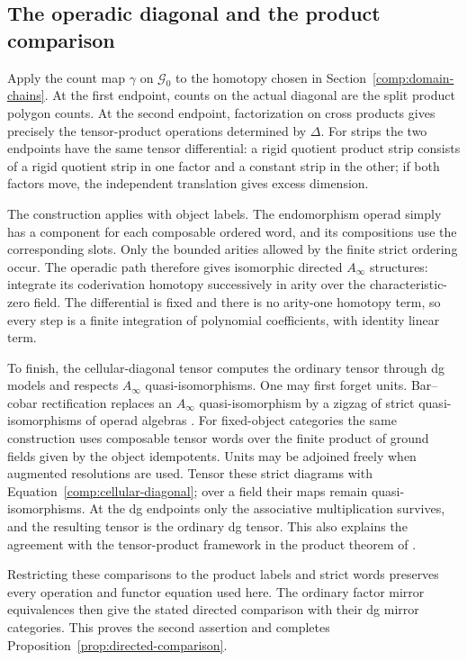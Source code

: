 \subsection{The operadic diagonal and the product comparison}
\label{comp:operadic-completion}

Apply the count map $\gamma$ on $\mathcal G_0$ to the homotopy
chosen in Section~\ref{comp:domain-chains}.  At the first
endpoint, counts on the actual diagonal are the split product
polygon counts.  At the second endpoint, factorization on cross
products gives precisely the tensor-product operations determined
by $\Delta$.  For strips the two endpoints have the same tensor
differential: a rigid quotient product strip consists of a rigid
quotient strip in one factor and a constant strip in the other;
if both factors move, the independent translation gives excess
dimension.

The construction applies with object labels.  The endomorphism
operad simply has a component for each composable ordered word,
and its compositions use the corresponding slots.  Only the
bounded arities allowed by the finite strict ordering occur.  The
operadic path therefore gives isomorphic directed $A_\infty$
structures: integrate its coderivation homotopy successively in
arity over the characteristic-zero field.  The differential is
fixed and there is no arity-one homotopy term, so every step is a
finite integration of polynomial coefficients, with identity
linear term.

To finish, the cellular-diagonal tensor computes the ordinary
tensor through dg models and respects $A_\infty$
quasi-isomorphisms.  One may first forget units.  Bar--cobar
rectification replaces an $A_\infty$ quasi-isomorphism by a
zigzag of strict quasi-isomorphisms of operad algebras
\cite{LodayVallette}.  For fixed-object categories the same
construction uses composable tensor words over the finite
product of ground fields given by the object idempotents.
Units may be adjoined freely when augmented resolutions are
used.  Tensor these strict diagrams with
Equation~\eqref{comp:cellular-diagonal}; over a field their maps
remain quasi-isomorphisms.  At the dg endpoints only the
associative multiplication survives, and the resulting tensor is
the ordinary dg tensor.  This also explains the agreement with
the tensor-product framework in the product theorem of
\cite{AmorimProduct}.

Restricting these comparisons to the product labels and strict
words preserves every operation and functor equation used here.
The ordinary factor mirror equivalences then give the stated
directed comparison with their dg mirror categories.  This proves
the second assertion and completes
Proposition~\ref{prop:directed-comparison}.
